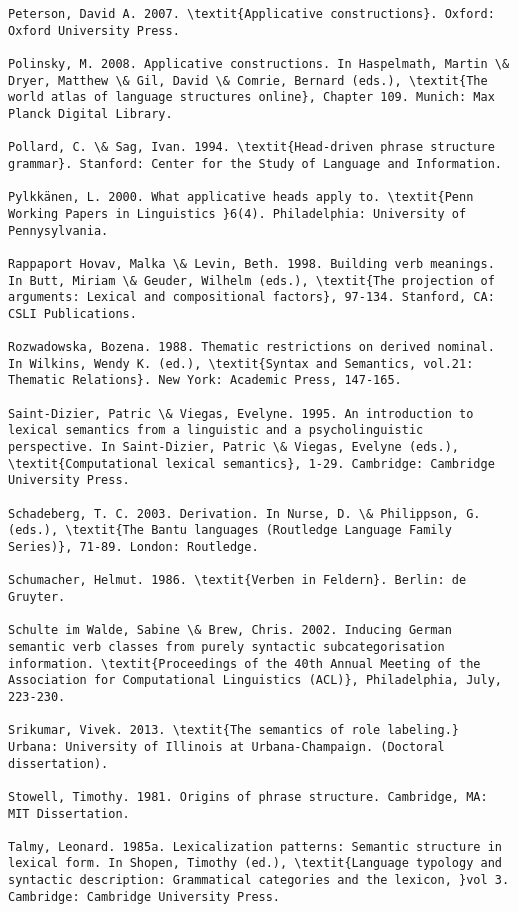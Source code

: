 \documentclass[output=paper]{langsci/langscibook}
\begin{document}
\begin{verbatim}
Peterson, David A. 2007. \textit{Applicative constructions}. Oxford: Oxford University Press.

Polinsky, M. 2008. Applicative constructions. In Haspelmath, Martin \& Dryer, Matthew \& Gil, David \& Comrie, Bernard (eds.), \textit{The world atlas of language structures online}, Chapter 109. Munich: Max Planck Digital Library.

Pollard, C. \& Sag, Ivan. 1994. \textit{Head-driven phrase structure grammar}. Stanford: Center for the Study of Language and Information.

Pylkkänen, L. 2000. What applicative heads apply to. \textit{Penn Working Papers in Linguistics }6(4). Philadelphia: University of Pennysylvania.

Rappaport Hovav, Malka \& Levin, Beth. 1998. Building verb meanings. In Butt, Miriam \& Geuder, Wilhelm (eds.), \textit{The projection of arguments: Lexical and compositional factors}, 97-134. Stanford, CA: CSLI Publications.

Rozwadowska, Bozena. 1988. Thematic restrictions on derived nominal. In Wilkins, Wendy K. (ed.), \textit{Syntax and Semantics, vol.21: Thematic Relations}. New York: Academic Press, 147-165.

Saint-Dizier, Patric \& Viegas, Evelyne. 1995. An introduction to lexical semantics from a linguistic and a psycholinguistic perspective. In Saint-Dizier, Patric \& Viegas, Evelyne (eds.), \textit{Computational lexical semantics}, 1-29. Cambridge: Cambridge University Press.

Schadeberg, T. C. 2003. Derivation. In Nurse, D. \& Philippson, G. (eds.), \textit{The Bantu languages (Routledge Language Family Series)}, 71-89. London: Routledge.

Schumacher, Helmut. 1986. \textit{Verben in Feldern}. Berlin: de Gruyter.

Schulte im Walde, Sabine \& Brew, Chris. 2002. Inducing German semantic verb classes from purely syntactic subcategorisation information. \textit{Proceedings of the 40th Annual Meeting of the Association for Computational Linguistics (ACL)}, Philadelphia, July, 223-230.

Srikumar, Vivek. 2013. \textit{The semantics of role labeling.} Urbana: University of Illinois at Urbana-Champaign. (Doctoral dissertation).

Stowell, Timothy. 1981. Origins of phrase structure. Cambridge, MA: MIT Dissertation.

Talmy, Leonard. 1985a. Lexicalization patterns: Semantic structure in lexical form. In Shopen, Timothy (ed.), \textit{Language typology and syntactic description: Grammatical categories and the lexicon, }vol 3. Cambridge: Cambridge University Press.


\end{verbatim}
\end{document}
